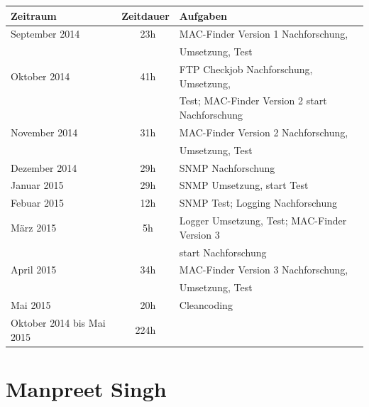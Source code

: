 \documentclass[12pt,a4paper]{report}
\begin{document}
\begin{onehalfspace}
\begin{tabular}{|l|c|l|}
\hline
\textbf{Zeitraum} & \textbf{Zeitdauer} & \textbf{Aufgaben} \\ \hline \hline
September 2014 & ~23h & MAC-Finder Version 1 Nachforschung, \\&& Umsetzung, Test\\ \hline
Oktober 2014 & ~41h & FTP Checkjob Nachforschung, Umsetzung,\\&& Test; MAC-Finder Version 2 start Nachforschung\\ \hline
November 2014 & ~31h & MAC-Finder Version 2 Nachforschung,\\&& Umsetzung, Test\\ \hline
Dezember 2014 & ~29h & SNMP Nachforschung\\ \hline
Januar 2015 & ~29h & SNMP Umsetzung, start Test\\ \hline
Febuar 2015 & ~12h & SNMP Test; Logging Nachforschung\\ \hline
März 2015 & ~5h & Logger Umsetzung, Test; MAC-Finder Version 3\\&& start Nachforschung\\ \hline
April 2015 & ~34h & MAC-Finder Version 3 Nachforschung,\\&& Umsetzung, Test\\ \hline
Mai 2015 & ~20h & Cleancoding\\
\hline \hline
Oktober 2014 bis Mai 2015 & 224h &\\ \hline
\end{tabular}

\chapter{Manpreet Singh}
\begin{tabular}{|l|c|l|}


\end{tabular}
\end{onehalfspace}
\end{document}

